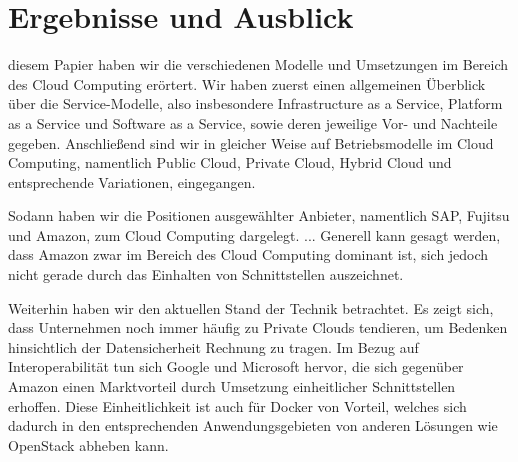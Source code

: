 \section{Ergebnisse und Ausblick}
\label{sec_conclusion}

 diesem Papier haben wir die verschiedenen Modelle und Umsetzungen im Bereich des Cloud Computing erörtert. 
Wir haben zuerst einen allgemeinen Überblick über die Service-Modelle, also insbesondere Infrastructure as a Service, Platform as a Service und Software as a Service, sowie deren jeweilige Vor- und Nachteile gegeben. 
Anschließend sind wir in gleicher Weise auf Betriebsmodelle im Cloud Computing, namentlich Public Cloud, Private Cloud, Hybrid Cloud und entsprechende Variationen, eingegangen. 


Sodann haben wir die Positionen ausgewählter Anbieter, namentlich SAP, Fujitsu und Amazon, zum Cloud Computing dargelegt.
...
Generell kann gesagt werden, dass Amazon zwar im Bereich des Cloud Computing dominant ist, sich jedoch nicht gerade durch das Einhalten von Schnittstellen auszeichnet.


Weiterhin haben wir den aktuellen Stand der Technik betrachtet.
Es zeigt sich, dass Unternehmen noch immer häufig zu Private Clouds tendieren, um Bedenken hinsichtlich der Datensicherheit Rechnung zu tragen. 
Im Bezug auf Interoperabilität tun sich Google und Microsoft hervor, die sich gegenüber Amazon einen Marktvorteil durch Umsetzung einheitlicher Schnittstellen erhoffen. 
Diese Einheitlichkeit ist auch für Docker von Vorteil, welches sich dadurch in den entsprechenden Anwendungsgebieten von anderen Lösungen wie OpenStack abheben kann. 


